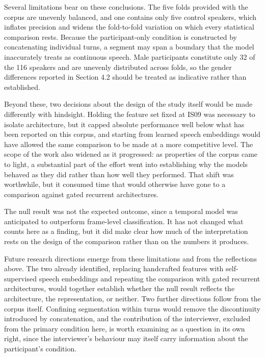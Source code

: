 \documentclass{mproj}
\begin{document}
Several limitations bear on these conclusions. The five folds provided with the corpus are unevenly balanced, and one contains only five control speakers, which inflates precision and widens the fold-to-fold variation on which every statistical comparison rests. Because the participant-only condition is constructed by concatenating individual turns, a segment may span a boundary that the model inaccurately treats as continuous speech. Male participants constitute only 32 of the 116 speakers and are unevenly distributed across folds, so the gender differences reported in Section 4.2 should be treated as indicative rather than established.

Beyond these, two decisions about the design of the study itself would be made differently with hindsight. Holding the feature set fixed at IS09 was necessary to isolate architecture, but it capped absolute performance well below what has been reported on this corpus, and starting from learned speech embeddings would have allowed the same comparison to be made at a more competitive level. The scope of the work also widened as it progressed: as properties of the corpus came to light, a substantial part of the effort went into establishing why the models behaved as they did rather than how well they performed. That shift was worthwhile, but it consumed time that would otherwise have gone to a comparison against gated recurrent architectures.

The null result was not the expected outcome, since a temporal model was anticipated to outperform frame-level classification. It has not changed what counts here as a finding, but it did make clear how much of the interpretation rests on the design of the comparison rather than on the numbers it produces.

Future research directions emerge from these limitations and from the reflections above. The two already identified, replacing handcrafted features with self-supervised speech embeddings and repeating the comparison with gated recurrent architectures, would together establish whether the null result reflects the architecture, the representation, or neither. Two further directions follow from the corpus itself. Confining segmentation within turns would remove the discontinuity introduced by concatenation, and the contribution of the interviewer, excluded from the primary condition here, is worth examining as a question in its own right, since the interviewer's behaviour may itself carry information about the participant's condition.
\end{document}
